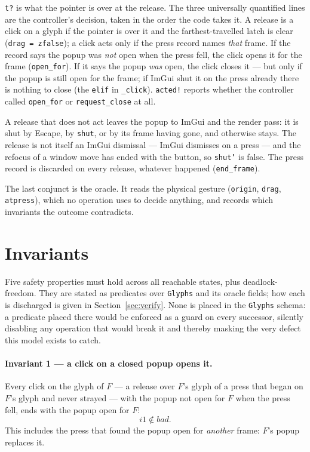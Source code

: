 \documentclass[a4paper,10pt,fleqn]{article}
\begin{document}
\texttt{t?} is what the pointer is over at the release.  The three universally
quantified lines are the controller's decision, taken in the order the code
takes it.  A release is a click on a glyph if the pointer is over it and the
farthest-travelled latch is clear (\texttt{drag~=~zfalse}); a click acts only
if the press record names \emph{that} frame.  If the record says the popup was
\emph{not} open when the press fell, the click opens it for the frame
(\texttt{open\_for}).  If it says the popup \emph{was} open, the click closes
it --- but only if the popup is still open for the frame; if ImGui shut it on
the press already there is nothing to close (the \texttt{elif} in
\texttt{\_click}).  \texttt{acted!} reports whether the controller called
\texttt{open\_for} or \texttt{request\_close} at all.

A release that does not act leaves the popup to ImGui and the render pass: it
is shut by Escape, by \texttt{shut}, or by its frame having gone, and otherwise
stays.  The release is not itself an ImGui dismissal --- ImGui dismisses on a
press --- and the refocus of a window move has ended with the button, so
\texttt{shut'} is false.  The press record is discarded on every release,
whatever happened (\texttt{end\_frame}).

The last conjunct is the oracle.  It reads the physical gesture
(\texttt{origin}, \texttt{drag}, \texttt{atpress}), which no operation uses to
decide anything, and records which invariants the outcome contradicts.

\section{Invariants}
\label{sec:inv}

Five safety properties must hold across all reachable states, plus
deadlock-freedom.  They are stated as predicates over \texttt{Glyphs} and its
oracle fields; how each is discharged is given in
Section~\ref{sec:verify}.  None is placed in the \texttt{Glyphs} schema: a
predicate placed there would be enforced as a guard on every successor, silently
disabling any operation that would break it and thereby masking the very defect
this model exists to catch.

\paragraph{Invariant 1 --- a click on a closed popup opens it.}
Every click on the glyph of $F$ --- a release over $F$'s glyph of a press that
began on $F$'s glyph and never strayed --- with the popup not open for $F$ when
the press fell, ends with the popup open for $F$:
\[
  i1 \notin bad.
\]
This includes the press that found the popup open for \emph{another} frame:
$F$'s popup replaces it.
\end{document}
